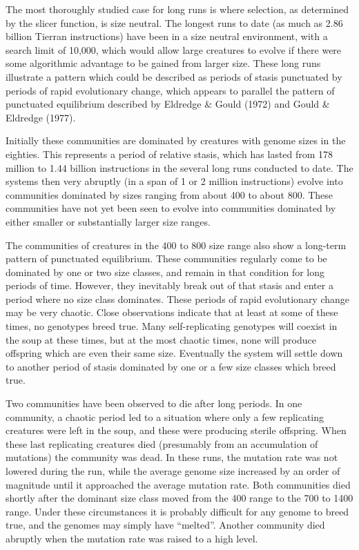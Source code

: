 The most thoroughly studied case for long runs is where selection, as
determined by the slicer function, is size neutral.  The longest runs to date
(as much as 2.86 billion Tierran instructions) have been in a size neutral
environment, with a search limit of 10,000, which would allow large creatures
to evolve if there were some algorithmic advantage to be gained from larger
size.  These long runs illustrate a pattern which could be described as
periods of stasis punctuated by periods of rapid evolutionary change, which
appears to parallel the pattern of punctuated equilibrium described by
Eldredge \& Gould (1972) and Gould \& Eldredge (1977).

Initially these communities are dominated by creatures with genome sizes
in the eighties.  This represents a period of relative stasis, which has
lasted from 178 million to 1.44 billion instructions in the several long
runs conducted to date.  The systems then very abruptly (in a span of 1 or
2 million instructions) evolve into communities dominated by sizes ranging
from about 400 to about 800.  These communities have not yet been seen to
evolve into communities dominated by either smaller or substantially larger
size ranges.

The communities of creatures in the 400 to 800 size range also show a
long-term pattern of punctuated equilibrium.  These communities regularly come
to be dominated by one or two size classes, and remain in that condition for
long periods of time.  However, they inevitably break out of that stasis
and enter a period where no size class dominates.  These periods of rapid
evolutionary change may be very chaotic.  Close observations indicate that
at least at some of these times, no genotypes breed true.  Many
self-replicating genotypes will coexist in the soup at these times, but at
the most chaotic times, none will produce offspring which are even their same
size.  Eventually the system will settle down to another period of stasis
dominated by one or a few size classes which breed true.

Two communities have been observed to die after long periods.  In one
community, a chaotic period led to a situation where only a few replicating
creatures were left in the soup, and these were producing sterile offspring.
When these last replicating creatures died (presumably from an accumulation
of mutations) the community was dead.  In these runs, the mutation rate was
not lowered during the run, while the average genome size increased by an
order of magnitude until it approached the average mutation rate.  Both
communities died shortly after the dominant size class moved from the 400
range to the 700 to 1400 range.  Under these circumstances it is probably
difficult for any genome to breed true, and the genomes may simply have
``melted''.  Another community died abruptly when the mutation rate was raised
to a high level.

